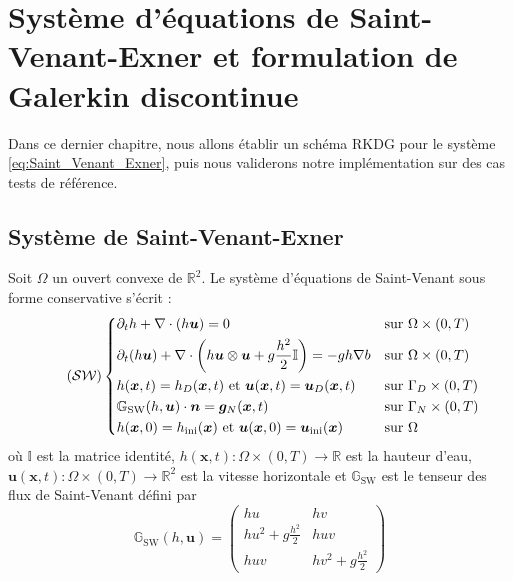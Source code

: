 \documentclass[11pt, a4paper, oneside]{report}
\begin{document}
\chapter{Système d'équations de Saint-Venant-Exner et formulation de Galerkin discontinue}

Dans ce dernier chapitre, nous allons établir un schéma RKDG pour le système \eqref{eq:Saint_Venant_Exner}, puis nous validerons notre implémentation sur des cas tests de référence.

\section{Système de Saint-Venant-Exner}

Soit $\Omega$ un ouvert convexe de $\mathbb{R}^2$. Le système d'équations de Saint-Venant sous forme conservative s'écrit :
\begin{equation} \tag{$\mathcal{SW}$} \label{eq:Saint_Venant} 
    \left \{
    \begin{aligned}
        & \partial_t h + \nabla \cdot \left( h \bm{u} \right) = 0 && \text{sur } \Omega \times (0, T) \\
        & \partial_t (h \bm{u}) + \nabla \cdot \left( h \bm{u} \otimes \bm{u} + g \frac{h^2}{2} \mathbb{I} \right) = - g h \nabla b && \text{sur } \Omega \times (0, T) \\
        & h(\bm{x}, t) = h_D(\bm{x}, t) \text{ et } \bm{u}(\bm{x}, t) = \bm{u}_D(\bm{x}, t) && \text{sur } \Gamma_D \times (0, T) \\
        & \mathbb{G}_\text{SW}(h, \bm{u}) \cdot \bm{n} = \bm{g}_N(\bm{x}, t) && \text{sur } \Gamma_N \times (0, T) \\
        & h(\bm{x}, 0) = h_\text{ini}(\bm{x}) \text{ et } \bm{u}(\bm{x}, 0) = \bm{u}_\text{ini}(\bm{x}) && \text{sur } \Omega
    \end{aligned}
    \right .
\end{equation} 
où $\mathbb{I}$ est la matrice identité, $h(\bm{x}, t) : \Omega \times (0, T) \longrightarrow \mathbb{R}$ est la hauteur d'eau, $\bm{u}(\bm{x}, t) : \Omega \times (0, T) \longrightarrow \mathbb{R}^2$ est la vitesse horizontale et $\mathbb{G}_\text{SW}$ est le tenseur des flux de Saint-Venant défini par
\begin{equation}
    \mathbb{G}_\text{SW}(h, \bm{u}) = \begin{pmatrix}
        hu & hv \\
        hu^2 + g \frac{h^2}{2} & huv \\
        huv & hv^2 + g \frac{h^2}{2}
    \end{pmatrix}
\end{equation}
\end{document}
